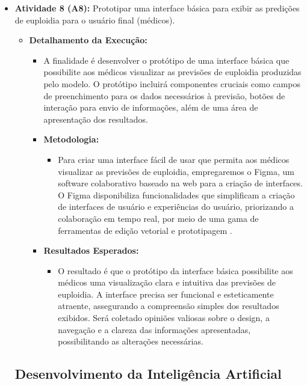 \begin{itemize}
\begin{itemize}
\begin{itemize}
\begin{itemize}
      \item \textbf{Atividade 8 (A8):} Prototipar uma interface básica para exibir as predições de euploidia para o usuário final (médicos).
      \begin{itemize}
        \item \textbf{Detalhamento da Execução:} 
        \begin{itemize}
          \item A finalidade é desenvolver o protótipo de uma interface básica que possibilite aos médicos visualizar as previsões de euploidia produzidas pelo modelo. O protótipo incluirá componentes cruciais como campos de preenchimento para os dados necessários à previsão, botões de interação para envio de informações, além de uma área de apresentação dos resultados.
        \item \textbf{Metodologia:} 
        \begin{itemize}
          \item Para criar uma interface fácil de usar que permita aos médicos visualizar as previsões de euploidia, empregaremos o Figma, um software colaborativo baseado na web para a criação de interfaces. O Figma disponibiliza funcionalidades que simplificam a criação de interfaces de usuário e experiências do usuário, priorizando a colaboração em tempo real, por meio de uma gama de ferramentas de edição vetorial e prototipagem \cite{figma2024}.
        \end{itemize}

        \item \textbf{Resultados Esperados:} 
        \begin{itemize}
          \item O resultado é que o protótipo da interface básica possibilite aos médicos uma visualização clara e intuitiva das previsões de euploidia. A interface precisa ser funcional e esteticamente atraente, assegurando a compreensão simples dos resultados exibidos. Será coletado opiniões valiosas sobre o design, a navegação e a clareza das informações apresentadas, possibilitando as alterações necessárias.
        \end{itemize}
      \end{itemize}
\end{itemize}

\subsection{Desenvolvimento da Inteligência Artificial}


\end{itemize}
\end{itemize}
\end{itemize}
\end{itemize}
